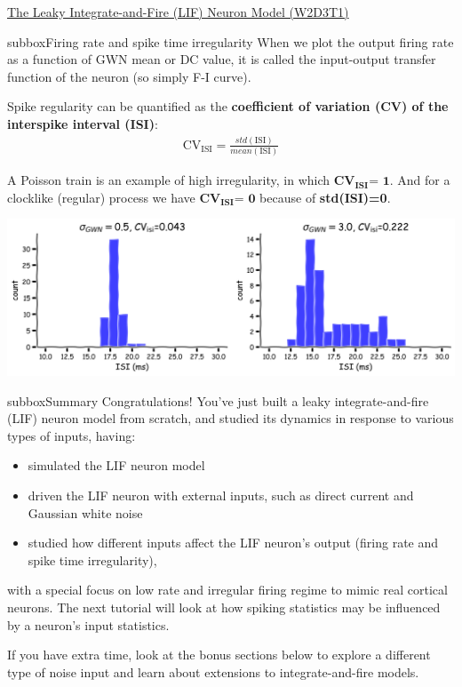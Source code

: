 \begin{textbox}{\href{https://compneuro.neuromatch.io/tutorials/W1D4_GeneralizedLinearModels/student/W1D4_Tutorial1.html}{The Leaky Integrate-and-Fire (LIF) Neuron Model (W2D3T1)} }
\begin{subbox}{subbox}{Firing rate and spike time irregularity}
\scriptsize
When we plot the output firing rate as a function of GWN mean or DC value, it is called the input-output transfer function of the neuron (so simply F-I curve).

Spike regularity can be quantified as the \textbf{coefficient of variation (CV) of the interspike interval (ISI)}:
\begin{align}
\text{CV}_{\text{ISI}} = \frac{std(\text{ISI})}{mean(\text{ISI})}
\end{align}

A Poisson train is an example of high irregularity, in which $\textbf{CV}_{\textbf{ISI}} \textbf{= 1}$. And for a clocklike (regular) process we have $\textbf{CV}_{\textbf{ISI}} \textbf{= 0}$ because of \textbf{std(ISI)=0}.

\centering
\includegraphics[scale=0.08]{Figures/BNM/LIF_Figure4.png}
\end{subbox}

\begin{subbox}{subbox}{Summary 
}
\scriptsize
Congratulations! You've just built a leaky integrate-and-fire (LIF) neuron model from scratch, and studied its dynamics in response to various types of inputs, having:
\begin{itemize}
    \item 
 simulated the LIF neuron model
\item 
 driven the LIF neuron with external inputs, such as direct current and Gaussian white noise

\item 
studied how different inputs affect the  LIF neuron's output (firing rate and spike time irregularity),
\end{itemize}

with a special focus on low rate and irregular firing regime to mimic real cortical neurons. The next tutorial will look at how spiking statistics may be influenced by a neuron's input statistics.

If you have extra time, look at the bonus sections below to explore a different type of noise input and learn about extensions to integrate-and-fire models.

\end{subbox}
\end{textbox}
